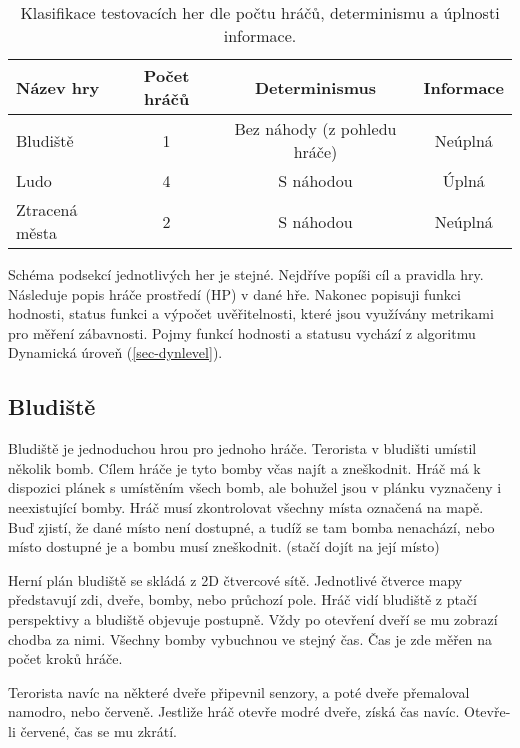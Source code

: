 \begin{table*}[t]\footnotesize
\vspace*{0mm}
\caption{{\label{tab:klasifikaceher}} Klasifikace testovacích her dle počtu hráčů, determinismu a úplnosti informace. }
\vspace*{0mm}
\label{shadowtable}
\begin{center}
\begin{tabular}{| l || c | c | c |}
\hline
Název hry & Počet hráčů & Determinismus & Informace \\
\hline
\hline
Bludiště & 1 & Bez náhody (z pohledu hráče) & Neúplná \\ \hline
Ludo & 4 & S náhodou & Úplná \\ \hline
Ztracená města & 2 & S náhodou & Neúplná \\ \hline
\end{tabular}
\end{center}
\end{table*}

Schéma podsekcí jednotlivých her je stejné. Nejdříve popíši cíl a pravidla hry. Následuje popis hráče prostředí (HP) v dané hře. Nakonec popisuji funkci hodnosti, status funkci a výpočet uvěřitelnosti, které jsou využívány metrikami pro měření zábavnosti. Pojmy funkcí hodnosti a statusu vychází z algoritmu Dynamická úroveň (\ref{sec-dynlevel}).

\subsection{Bludiště}

Bludiště je jednoduchou hrou pro jednoho hráče. Terorista v bludišti umístil několik bomb. Cílem hráče je tyto bomby včas najít a zneškodnit. Hráč má k dispozici plánek s umístěním všech bomb, ale bohužel jsou v plánku vyznačeny i neexistující bomby. Hráč musí zkontrolovat všechny místa označená na mapě. Buď zjistí, že dané místo není dostupné, a tudíž se tam bomba nenachází, nebo místo dostupné je a bombu musí zneškodnit. (stačí dojít na její místo) 

Herní plán bludiště se skládá z 2D čtvercové sítě. Jednotlivé čtverce mapy představují zdi, dveře, bomby, nebo průchozí pole. Hráč vidí bludiště z ptačí perspektivy a bludiště objevuje postupně. Vždy po otevření dveří se mu zobrazí chodba za nimi. Všechny bomby vybuchnou ve stejný čas. Čas je zde měřen na počet kroků hráče.

Terorista navíc na některé dveře připevnil senzory, a poté dveře přemaloval namodro, nebo červeně. Jestliže hráč otevře modré dveře, získá čas navíc. Otevře-li červené, čas se mu zkrátí.

